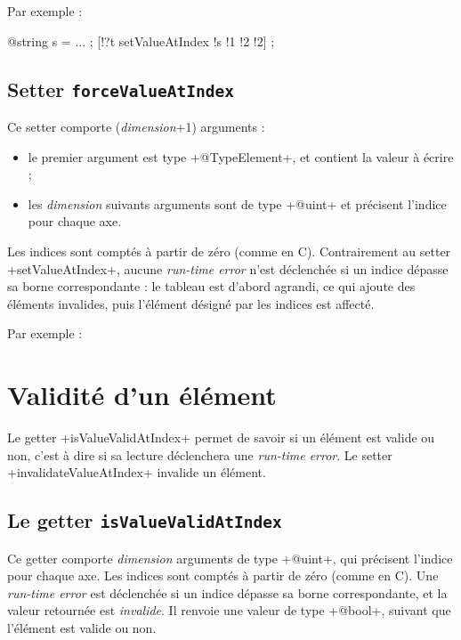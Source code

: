 Par exemple :
\begin{galgas}
  @string s = ... ;
  [!?t setValueAtIndex !s !1 !2 !2] ;
\end{galgas}





\subsection{Setter \texttt{forceValueAtIndex}}

Ce setter comporte (\emph{dimension}+1) arguments :
\begin{itemize}
  \item le premier argument est type \ggs+@TypeElement+, et contient la valeur à écrire ;
  \item les \emph{dimension} suivants arguments sont de type \ggs+@uint+ et précisent l'indice pour chaque axe.
\end{itemize} 
  
Les indices sont comptés à partir de zéro (comme en C). Contrairement au setter \ggs+setValueAtIndex+, aucune \emph{run-time error} n'est déclenchée si un indice dépasse sa borne correspondante : le tableau est d'abord agrandi, ce qui ajoute des éléments invalides, puis l'élément désigné par les indices est affecté.

Par exemple :
\begin{galgas}
  @string s = ... ;
  [}?t forceValueAtIndex !s !5 !4 !4] ;
\end{galgas}





\section{Validité d'un élément}

Le getter \ggs+isValueValidAtIndex+ permet de savoir si un élément est valide ou non, c'est à dire si sa lecture déclenchera une \emph{run-time error}. Le setter \ggs+invalidateValueAtIndex+ invalide un élément.

\subsection{Le getter \texttt{isValueValidAtIndex}}

Ce getter comporte \emph{dimension} arguments de type \ggs+@uint+, qui précisent l'indice pour chaque axe. Les indices sont comptés à partir de zéro (comme en C). Une \emph{run-time error} est déclenchée si un indice dépasse sa borne correspondante, et la valeur retournée est \emph{invalide}. Il renvoie une valeur de type \ggs+@bool+, suivant que l'élément est valide ou non.

